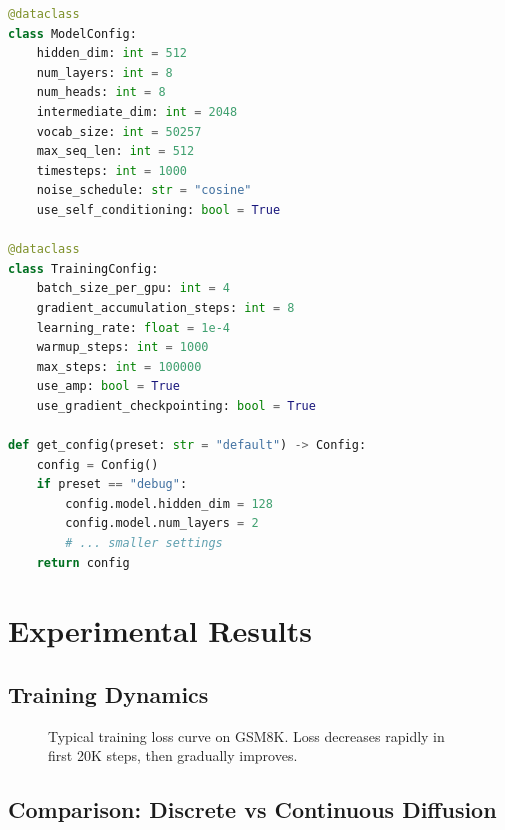 \documentclass[11pt,a4paper]{article}
\begin{document}
\begin{lstlisting}[language=Python]
@dataclass
class ModelConfig:
    hidden_dim: int = 512
    num_layers: int = 8
    num_heads: int = 8
    intermediate_dim: int = 2048
    vocab_size: int = 50257
    max_seq_len: int = 512
    timesteps: int = 1000
    noise_schedule: str = "cosine"
    use_self_conditioning: bool = True

@dataclass
class TrainingConfig:
    batch_size_per_gpu: int = 4
    gradient_accumulation_steps: int = 8
    learning_rate: float = 1e-4
    warmup_steps: int = 1000
    max_steps: int = 100000
    use_amp: bool = True
    use_gradient_checkpointing: bool = True

def get_config(preset: str = "default") -> Config:
    config = Config()
    if preset == "debug":
        config.model.hidden_dim = 128
        config.model.num_layers = 2
        # ... smaller settings
    return config
\end{lstlisting}

\section{Experimental Results}

\subsection{Training Dynamics}

\begin{figure}[H]
\centering
{}
\caption{Typical training loss curve on GSM8K. Loss decreases rapidly in first 20K steps, then gradually improves.}
\label{fig:training}
\end{figure}

\subsection{Comparison: Discrete vs Continuous Diffusion}
\end{document}
